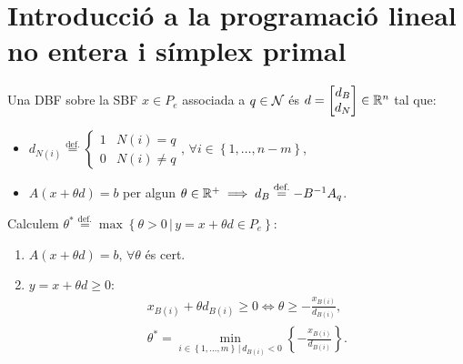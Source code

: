\section{Introducció a la programació lineal no entera i símplex primal}

\begin{defi}
    Una DBF sobre la SBF $x \in P_e$ associada a $q \in \mathcal{N}$ és $d =
    \begin{bmatrix}
        d_B \\
        d_N
    \end{bmatrix}
    \in \mathbb{R}^n$ tal que:
    \begin{itemize}
        \item $d_{N\left(i\right)} \stackrel{\text{def.}}{=}
            \begin{cases}
                1 & N\left(i\right) = q \\
                0 & N\left(i\right) \neq q
            \end{cases}
            ,\, \forall i \in \left\{1, \dots, n-m \right\}$,
        \item $A \left(x + \theta d\right) = b$ per algun $\theta \in \mathbb{R}^+ \implies d_B \stackrel{\text{def.}}{=} -B^{-1} A_q$.
    \end{itemize}
\end{defi}
\pagebreak                  %
\begin{prop}
    Calculem $\theta^* \stackrel{\text{def.}}{=} \max \left\{ \theta > 0 \, |\, y = x + \theta d \in P_e\right\}$:
    \begin{enumerate}
        \item $A\left(x + \theta d\right) = b,\, \forall \theta$ és cert.
        \item $y = x + \theta d \geq 0$:
            \begin{gather*}
                x_{B\left(i\right)} + \theta d_{B\left(i\right)} \geq 0 \iff \theta \geq -\frac{x_{B\left(i\right)}}{d_{B\left(i\right)}}, \\
                \theta^* = \min_{i \in \left\{1, \dots, m \right\} \, |\, d_{B\left(i\right)} < 0} \left\{ - \frac{x_{B\left(i\right)}}{d_{B\left(i\right)}} \right\}.
            \end{gather*}
    \end{enumerate}
\end{prop}
